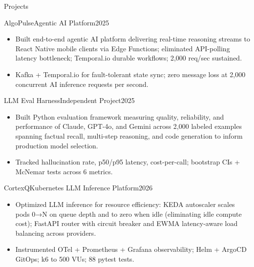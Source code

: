 \documentclass[]{mcdowellcv}
\begin{document}
\begin{cvsection}{Projects}
  \begin{cvsubsection}{AlgoPulse}{Agentic AI Platform}{2025}
    \begin{itemize}
      \item Built end-to-end agentic AI platform delivering real-time reasoning streams to React Native mobile clients via Edge Functions; eliminated API-polling latency bottleneck; Temporal.io durable workflows; 2,000 req/sec sustained.
      \item Kafka + Temporal.io for fault-tolerant state sync; zero message loss at 2,000 concurrent AI inference requests per second.
    \end{itemize}
    \vspace{-1.5pt}
  \end{cvsubsection}

  \begin{cvsubsection}{LLM Eval Harness}{Independent Project}{2025}
    \begin{itemize}
      \item Built Python evaluation framework measuring quality, reliability, and performance of Claude, GPT-4o, and Gemini across 2,000 labeled examples spanning factual recall, multi-step reasoning, and code generation to inform production model selection.
      \item Tracked hallucination rate, p50/p95 latency, cost-per-call; bootstrap CIs + McNemar tests across 6 metrics.
    \end{itemize}
    \vspace{-1.5pt}
  \end{cvsubsection}

  \begin{cvsubsection}{CortexQ}{Kubernetes LLM Inference Platform}{2026}
    \begin{itemize}
      \item Optimized LLM inference for resource efficiency: KEDA autoscaler scales pods 0→N on queue depth and to zero when idle (eliminating idle compute cost); FastAPI router with circuit breaker and EWMA latency-aware load balancing across providers.
      \item Instrumented OTel + Prometheus + Grafana observability; Helm + ArgoCD GitOps; k6 to 500 VUs; 88 pytest tests.
    \end{itemize}
    \vspace{-1.5pt}
  \end{cvsubsection}


\end{cvsection}
\end{document}
